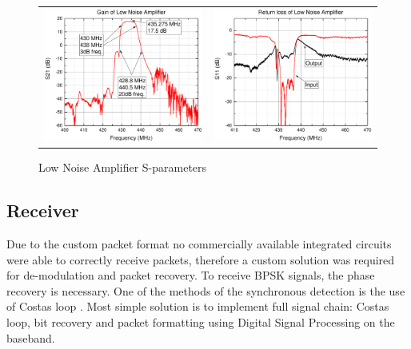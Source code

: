 \begin{figure}
   \centering
\begin{tabular}{cc}
        \includegraphics[width=0.35\paperwidth]{img/7/LnaGain.pdf}
    & 
        \includegraphics[width=0.35\paperwidth]{img/7/LnaMatch.pdf}
\end{tabular}
\label{lna_s_params}
\caption{Low Noise Amplifier S-parameters}
\end{figure}


\subsection{Receiver}
Due to the custom packet format no commercially available integrated circuits were able to correctly receive packets, therefore a custom solution was required for de-modulation and packet recovery.
To receive BPSK signals, the phase recovery is necessary. One of the methods of the synchronous detection is the use of Costas loop \cite{costas_loop}. Most simple solution is to implement full signal chain: Costas loop, bit recovery and packet formatting using Digital Signal Processing on the baseband.

